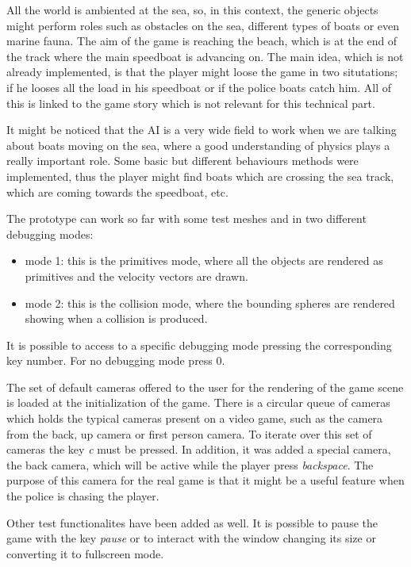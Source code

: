 \documentclass[]{article}
\begin{document}
All the world is ambiented at the sea, so, in this context, the generic objects might perform roles such as obstacles on the sea, different types of boats or even marine fauna. The aim of the game is reaching the beach, which is at the end of the track where the main speedboat is advancing on. The main idea, which is not already implemented, is that the player might loose the game in two situtations; if he looses all the load in his speedboat or if the police boats catch him. All of this is linked to the game story which is not relevant for this technical part.

It might be noticed that the AI is a very wide field to work when we are talking about boats moving on the sea, where a good understanding of physics plays a really important role. Some basic but different behaviours methods were implemented, thus the player might find boats which are crossing the sea track, which are coming towards the speedboat, etc. 

The prototype can work so far with some test meshes and in two different debugging modes:

\begin{itemize}
\item mode 1: this is the primitives mode, where all the objects are rendered as primitives and the velocity vectors are drawn.
\item mode 2: this is the collision mode, where the bounding spheres are rendered showing when a collision is produced.
\end{itemize}

It is possible to access to a specific debugging mode pressing the corresponding key number. For no debugging mode press 0.

The set of default cameras offered to the user for the rendering of the game scene is loaded at the initialization of the game. There is a circular queue of cameras which holds the typical cameras present on a video game, such as the camera from the back, up camera or first person camera. To iterate over this set of cameras the key \emph{c} must be pressed. In addition, it was added a special camera, the back camera, which will be active while the player press \emph{backspace}. The purpose of this camera for the real game is that it might be a useful feature when the police is chasing the player.

Other test functionalites have been added as well. It is possible to pause the game with the key \emph{pause} or to interact with the window changing its size or converting it to fullscreen mode.
\end{document}
